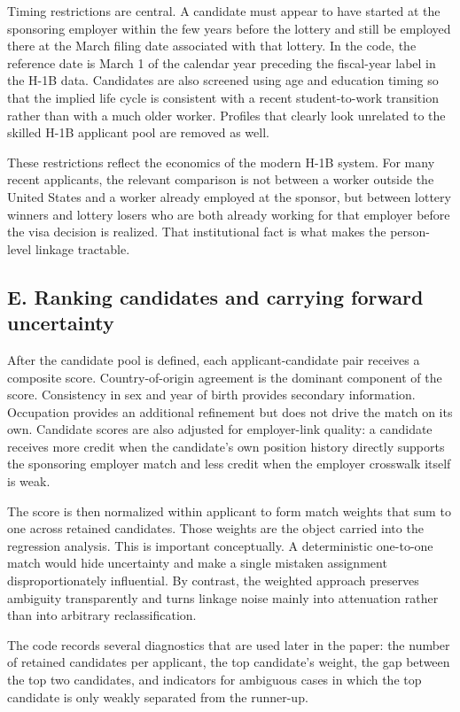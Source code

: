 Timing restrictions are central. A candidate must appear to have started at the sponsoring employer within the few years before the lottery and still be employed there at the March filing date associated with that lottery. In the code, the reference date is March 1 of the calendar year preceding the fiscal-year label in the H-1B data. Candidates are also screened using age and education timing so that the implied life cycle is consistent with a recent student-to-work transition rather than with a much older worker. Profiles that clearly look unrelated to the skilled H-1B applicant pool are removed as well.

These restrictions reflect the economics of the modern H-1B system. For many recent applicants, the relevant comparison is not between a worker outside the United States and a worker already employed at the sponsor, but between lottery winners and lottery losers who are both already working for that employer before the visa decision is realized. That institutional fact is what makes the person-level linkage tractable.

\subsection{E. Ranking candidates and carrying forward uncertainty}

After the candidate pool is defined, each applicant-candidate pair receives a composite score. Country-of-origin agreement is the dominant component of the score. Consistency in sex and year of birth provides secondary information. Occupation provides an additional refinement but does not drive the match on its own. Candidate scores are also adjusted for employer-link quality: a candidate receives more credit when the candidate's own position history directly supports the sponsoring employer match and less credit when the employer crosswalk itself is weak.

The score is then normalized within applicant to form match weights that sum to one across retained candidates. Those weights are the object carried into the regression analysis. This is important conceptually. A deterministic one-to-one match would hide uncertainty and make a single mistaken assignment disproportionately influential. By contrast, the weighted approach preserves ambiguity transparently and turns linkage noise mainly into attenuation rather than into arbitrary reclassification.

The code records several diagnostics that are used later in the paper: the number of retained candidates per applicant, the top candidate's weight, the gap between the top two candidates, and indicators for ambiguous cases in which the top candidate is only weakly separated from the runner-up.

